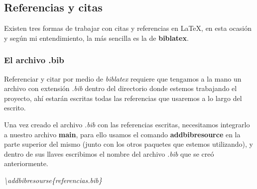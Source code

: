 \subsection{Referencias y citas}
\hspace{0.55cm}Existen tres formas de trabajar con citas y referencias en \LaTeX, en esta ocasión y según mi entendimiento, la más sencilla es la de \textbf{biblatex}.


\subsubsection{El archivo .bib}
\hspace{0.55cm}Referenciar y citar por medio de \textit{biblatex} requiere que tengamos a la mano un archivo con extensión \textit{.bib} dentro del directorio donde estemos trabajando el proyecto, ahí estarán escritas todas las referencias que usaremos a lo largo del escrito.

Una vez creado el archivo \textit{.bib} con las referencias escritas, necesitamos integrarlo a nuestro archivo \textbf{main}, para ello usamos el comando \textbf{addbibresource} en la parte superior del mismo (junto con los otros paquetes que estemos utilizando), y dentro de sus llaves escribimos el nombre del archivo \textit{.bib} que se creó anteriormente.
\begin{center}
    \textit{\textbackslash{addbibresourse\{referencias.bib\}}}
\end{center}

